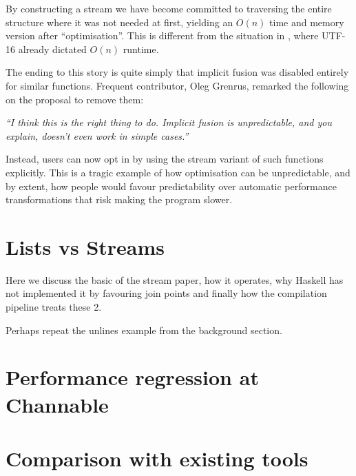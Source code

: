By constructing a stream we have become committed to traversing the entire structure where it was not needed at first,
yielding an $O(n)$ time and memory version after ``optimisation''. This is different from the situation in ,
where UTF-16 already dictated $O(n)$ runtime.

The ending to this story is quite simply that implicit fusion was disabled entirely \cite{two_tails} for similar functions.
Frequent  contributor, Oleg Grenrus, remarked the following on the proposal to remove them:

\textit{``I think this is the right thing to do. Implicit fusion is unpredictable, and you explain, doesn't even work in simple cases.''}

Instead, users can now opt in by using the stream variant of such functions explicitly. This is a tragic example of how optimisation
can be unpredictable, and by extent, how people would favour predictability over automatic performance transformations that risk making the program slower.

\section{Lists vs Streams}

Here we discuss the basic of the stream paper, how it operates, why Haskell has not implemented it by favouring join points and
finally how the compilation pipeline treats these 2.

Perhaps repeat the unlines example from the background section.


\section{Performance regression at Channable}

%

\section{Comparison with existing tools}

